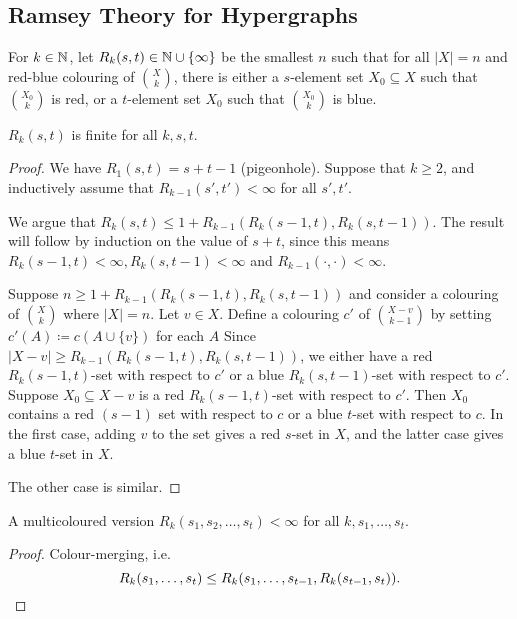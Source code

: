 \documentclass[main.tex]{subfiles}
\begin{document}
\subsection{Ramsey Theory for Hypergraphs}
For $k\in\mathbb N$, let $R_k(s,t)\in\mathbb N\cup\{\infty\}$ be the smallest $n$ such that
for all $|X| = n$ and red-blue colouring of $\binom{X}{k}$, there is either a
$s$-element set $X_0\subseteq X$ such that $\binom{X_0}{k}$ is red,
or a $t$-element set $X_0$ such that $\binom{X_0}{k}$ is blue.
\begin{theorem}
  $R_k(s,t)$ is finite for all $k, s, t$.
\end{theorem}
\begin{proof}
  We have $R_1(s,t) = s+t-1$ (pigeonhole).
  Suppose that $k\geq 2$, and inductively assume that $R_{k-1}(s',t') < \infty$
  for all $s',t'$.

  We argue that $R_k(s,t)\leq 1 + R_{k-1}(R_k(s-1,t),R_k(s,t-1))$.
  The result will follow by induction on the value of $s+t$, since this means
  $R_k(s-1,t) < \infty, R_k(s,t-1) < \infty$ and $R_{k-1}(\cdot,\cdot) < \infty$.

  Suppose $n\geq 1 + R_{k-1}(R_k(s-1,t),R_k(s,t-1))$ and consider a colouring
  of $\binom X k$ where $|X| = n$.
  Let $v\in X$.
  Define a colouring $c'$ of $\binom{X-v}{k-1}$ by setting
  $c'(A)\coloneqq c(A\cup\{v\})$ for each $A$
  Since $|X-v|\geq R_{k-1}(R_k(s-1,t), R_k(s,t-1))$, we either have a red
  $R_k(s-1,t)$-set with respect to $c'$ or a blue $R_k(s,t-1)$-set with respect
  to $c'$.
  Suppose $X_0\subseteq X-v$ is a red $R_k(s-1,t)$-set with respect to $c'$.
  Then $X_0$ contains a red $(s-1)$ set with respect to $c$ or a blue $t$-set
  with respect to $c$.
  In the first case, adding $v$ to the set gives a red $s$-set in $X$,
  and the latter case gives a blue $t$-set in $X$.

  The other case is similar.
\end{proof}
\begin{corollary*}
  A multicoloured version $R_k(s_1,s_2,\ldots,s_t) < \infty$ for all
  $k,s_1,\ldots,s_t$.
\end{corollary*}
\begin{proof}
  Colour-merging, i.e.
  \[
    R_k(s_1,\ldots,s_t)\leq R_k(s_1,\ldots,s_{t-1}, R_k(s_{t-1},s_t)). \qedhere
  \]
\end{proof}
\end{document}
